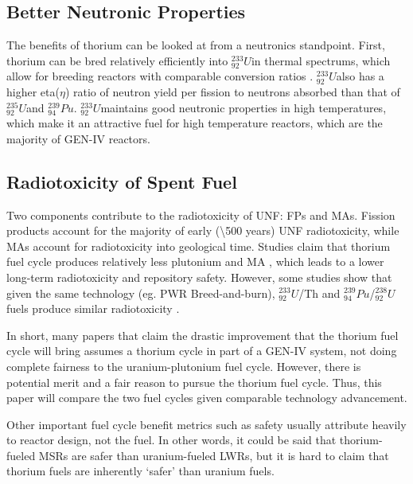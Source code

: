 \documentclass{article}
\newcommand{\uthree}{$^{233}_{92}U$}
\newcommand{\ufive}{$^{235}_{92}U$}%
\newcommand{\ueight}{$^{238}_{92}U$}
\newcommand{\pu}{$^{239}_{94}Pu$}
\begin{document}
\subsection{Better Neutronic Properties}
The benefits of thorium can be looked at from a neutronics standpoint.
First, thorium can be bred relatively efficiently into \uthree in thermal spectrums,
which allow for breeding reactors with comparable conversion ratios \cite{allibert_introduction_2015}.
\uthree also has a higher eta($\eta$) ratio of neutron yield per fission to 
neutrons absorbed than that of \ufive and \pu \cite{lung_perspectives_1998}.
\uthree maintains good neutronic properties in high temperatures,
which make it an attractive fuel for high temperature reactors, which
are the majority of GEN-IV reactors.

\subsection{Radiotoxicity of Spent Fuel}
Two components contribute to the radiotoxicity of 
\gls{UNF}: \glspl{FP} and \glspl{MA}.
Fission products account for the majority of early (\textbackslash 500 years)
\gls{UNF} radiotoxicity, while \glspl{MA} account for 
radiotoxicity into geological time.
Studies claim that thorium fuel cycle produces relatively
less plutonium and \gls{MA} \cite{boczar_thorium_2002} \cite{david_revisiting_2007},
which leads to a lower long-term radiotoxicity and repository safety.
However, some studies show that given the same technology (eg. \gls{PWR} Breed-and-burn),
\uthree/Th and \pu/\ueight fuels produce similar radiotoxicity \cite{croff_comparative_2016}.

In short, many papers that claim the drastic improvement that the thorium
fuel cycle will bring assumes a thorium cycle in part of a GEN-IV system,
not doing complete fairness to the uranium-plutonium fuel cycle. However,
there is potential merit and a fair reason to pursue the thorium fuel cycle.
Thus, this paper will compare the two fuel cycles given comparable technology
advancement. 




\cite{herring_uranium_2013}

Other important fuel cycle benefit metrics
such as safety usually attribute heavily
to reactor design, not the fuel. In other words,
it could be said that thorium-fueled \glspl{MSR} are safer
than uranium-fueled \glspl{LWR}, but it is hard to claim
that thorium fuels are inherently `safer' than uranium fuels.
\end{document}
